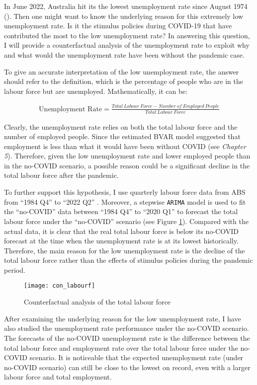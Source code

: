 \documentclass{monashthesis}
\begin{document}
In June 2022, Australia hit its the lowest unemployment rate since August 1974 (\textcite{ABS2022a}). Then one might want to know the underlying reason for this extremely low unemployment rate. Is it the stimulus policies during COVID-19 that have contributed the most to the low unemployment rate? In answering this question, I will provide a counterfactual analysis of the unemployment rate to exploit why and what would the unemployment rate have been without the pandemic case.

To give an accurate interpretation of the low unemployment rate, the answer should refer to the definition, which is the percentage of people who are in the labour force but are unemployed. Mathematically, it can be:

\[
\begin{aligned}
\text{Unemployment Rate}=\frac{Total\ Labour\  Force- Number\ of \ Employed \ People}{Total\ Labour \ Force}
\label{equ:unemp}
\end{aligned}
\]

Clearly, the unemployment rate relies on both the total labour force and the number of employed people. Since the estimated BVAR model suggested that employment is less than what it would have been without COVID (see \emph{Chapter 5}). Therefore, given the low unemployment rate and lower employed people than in the no-COVID scenario, a possible reason could be a significant decline in the total labour force after the pandemic.

To further support this hypothesis, I use quarterly labour force data from ABS from ``1984 Q4'' to ``2022 Q2'' \autocite{ABS2022}. Moreover, a stepwise \texttt{ARIMA} model \autocite{fpp3} is used to fit the ``no-COVID'' data between ``1984 Q4'' to ``2020 Q1'' to forecast the total labour force under the ``no-COVID'' scenario (see Figure \ref{fig:lab}). Compared with the actual data, it is clear that the real total labour force is below its no-COVID forecast at the time when the unemployment rate is at its lowest historically. Therefore, the main reason for the low unemployment rate is the decline of the total labour force rather than the effects of stimulus policies during the pandemic period.

\begin{figure}[H]
\texttt{[image: con\_labourf]}
\centering
\caption{Counterfactual analysis of the total labour force}
\label{fig:lab}
\end{figure}

After examining the underlying reason for the low unemployment rate, I have also studied the unemployment rate performance under the no-COVID scenario. The forecasts of the no-COVID unemployment rate is the difference between the total labour force and employment rate over the total labour force under the no-COVID scenario. It is noticeable that the expected unemployment rate (under no-COVID scenario) can still be close to the lowest on record, even with a larger labour force and total employment.
\end{document}
